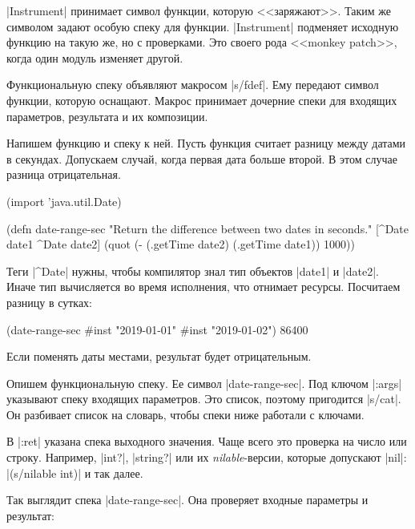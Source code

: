 \spverb|Instrument| принимает символ функции, которую <<заряжают>>. Таким же
символом задают особую спеку для функции. \spverb|Instrument| подменяет исходную
функцию на такую же, но с проверками. Это своего рода <<monkey patch>>, когда
один модуль изменяет другой.

Функциональную спеку объявляют макросом \spverb|s/fdef|. Ему передают символ
функции, которую оснащают. Макрос принимает дочерние спеки для входящих
параметров, результата и их композиции.

Напишем функцию и спеку к ней. Пусть функция считает разницу между датами в
секундах. Допускаем случай, когда первая дата больше второй. В этом случае
разница отрицательная.

\begin{english}
  \begin{clojure}
(import 'java.util.Date)

(defn date-range-sec
  "Return the difference between two dates in seconds."
  [^Date date1 ^Date date2]
  (quot (- (.getTime date2)
           (.getTime date1))
        1000))
  \end{clojure}
\end{english}

Теги \spverb|^Date| нужны, чтобы компилятор знал тип объектов \spverb|date1| и
\spverb|date2|. Иначе тип вычисляется во время исполнения, что отнимает
ресурсы. Посчитаем разницу в сутках:

\begin{english}
  \begin{clojure}
(date-range-sec #inst "2019-01-01" #inst "2019-01-02")
86400
  \end{clojure}
\end{english}

\noindent
Если поменять даты местами, результат будет отрицательным.

Опишем функциональную спеку. Ее символ \spverb|date-range-sec|. Под ключом
\spverb|:args| указывают спеку входящих параметров. Это список, поэтому
пригодится \spverb|s/cat|. Он разбивает список на словарь, чтобы спеки ниже
работали с ключами.

В \spverb|:ret| указана спека выходного значения. Чаще всего это проверка на
число или строку. Например, \spverb|int?|, \spverb|string?| или их
\emph{nilable}-версии, которые допускают \spverb|nil|: \spverb|(s/nilable int)|
и так далее.

Так выглядит спека \spverb|date-range-sec|. Она проверяет входные параметры и
результат:

